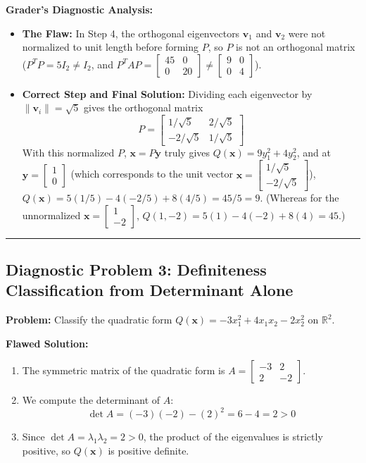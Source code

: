 \documentclass[11pt, letterpaper]{article}
\theoremstyle{definition}
\theoremstyle{remark}
\begin{document}
\textbf{Grader's Diagnostic Analysis:}
\begin{itemize}
    \item \textbf{The Flaw:} In Step 4, the orthogonal eigenvectors $\mathbf{v}_1$ and $\mathbf{v}_2$ were not normalized to unit length before forming $P$, so $P$ is not an orthogonal matrix ($P^T P = 5I_2 \neq I_2$, and $P^T A P = \begin{bmatrix} 45 & 0 \\ 0 & 20 \end{bmatrix} \neq \begin{bmatrix} 9 & 0 \\ 0 & 4 \end{bmatrix}$).
    \item \textbf{Correct Step and Final Solution:} Dividing each eigenvector by $\|\mathbf{v}_i\| = \sqrt{5}$ gives the orthogonal matrix
    \[
    P = \begin{bmatrix} 1/\sqrt{5} & 2/\sqrt{5} \\ -2/\sqrt{5} & 1/\sqrt{5} \end{bmatrix}
    \]
    With this normalized $P$, $\mathbf{x} = P\mathbf{y}$ truly gives $Q(\mathbf{x}) = 9y_1^2 + 4y_2^2$, and at $\mathbf{y} = \begin{bmatrix} 1 \\ 0 \end{bmatrix}$ (which corresponds to the unit vector $\mathbf{x} = \begin{bmatrix} 1/\sqrt{5} \\ -2/\sqrt{5} \end{bmatrix}$), $Q(\mathbf{x}) = 5(1/5) - 4(-2/5) + 8(4/5) = 45/5 = 9$. (Whereas for the unnormalized $\mathbf{x} = \begin{bmatrix} 1 \\ -2 \end{bmatrix}$, $Q(1, -2) = 5(1) - 4(-2) + 8(4) = 45$.)
\end{itemize}

\medskip\hrule\medskip

\subsection*{Diagnostic Problem 3: Definiteness Classification from Determinant Alone}
\textbf{Problem:} Classify the quadratic form $Q(\mathbf{x}) = -3x_1^2 + 4x_1x_2 - 2x_2^2$ on $\mathbb{R}^2$.

\textbf{Flawed Solution:}
\begin{enumerate}
    \item The symmetric matrix of the quadratic form is $A = \begin{bmatrix} -3 & 2 \\ 2 & -2 \end{bmatrix}$.
    \item We compute the determinant of $A$:
    \[
    \det A = (-3)(-2) - (2)^2 = 6 - 4 = 2 > 0
    \]
    \item Since $\det A = \lambda_1 \lambda_2 = 2 > 0$, the product of the eigenvalues is strictly positive, so $Q(\mathbf{x})$ is positive definite.
\end{enumerate}
\end{document}
